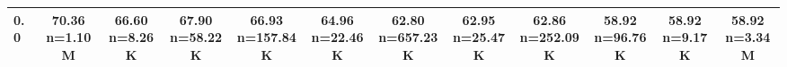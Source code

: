 \begin{table}
\begin{tabular}{lccccccccccc}
0.0 & \makecell{70.36 \\ \scriptsize n=1.10M} & \makecell{66.60 \\ \scriptsize n=8.26K} & \makecell{67.90 \\ \scriptsize n=58.22K} & \makecell{66.93 \\ \scriptsize n=157.84K} & \makecell{64.96 \\ \scriptsize n=22.46K} & \makecell{62.80 \\ \scriptsize n=657.23K} & \makecell{62.95 \\ \scriptsize n=25.47K} & \makecell{62.86 \\ \scriptsize n=252.09K} & \makecell{58.92 \\ \scriptsize n=96.76K} & \makecell{58.92 \\ \scriptsize n=9.17K} & \makecell{58.92 \\ \scriptsize n=3.34M} \\
            \bottomrule
            \end{tabular}
            \label{tab:si-disruption-matrix-3}
            \end{table}